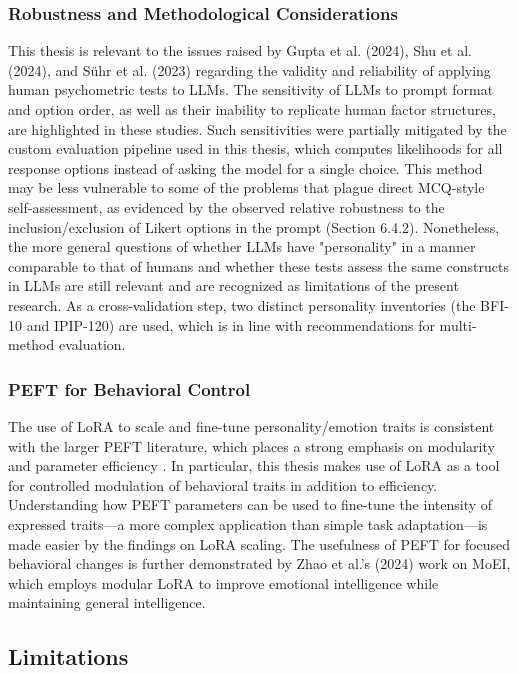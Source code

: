 \documentclass{DESSThesis}
\begin{document}
\subsubsection{Robustness and Methodological Considerations}
This thesis is relevant to the issues raised by Gupta et al. (2024), Shu et al. (2024), and Sühr et al. (2023) regarding the validity and reliability of applying human psychometric tests to LLMs. The sensitivity of LLMs to prompt format and option order, as well as their inability to replicate human factor structures, are highlighted in these studies. Such sensitivities were partially mitigated by the custom evaluation pipeline used in this thesis, which computes likelihoods for all response options instead of asking the model for a single choice. This method may be less vulnerable to some of the problems that plague direct MCQ-style self-assessment, as evidenced by the observed relative robustness to the inclusion/exclusion of Likert options in the prompt (Section 6.4.2). Nonetheless, the more general questions of whether LLMs have "personality" in a manner comparable to that of humans and whether these tests assess the same constructs in LLMs are still relevant and are recognized as limitations of the present research. As a cross-validation step, two distinct personality inventories (the BFI-10 and IPIP-120) are used, which is in line with recommendations for multi-method evaluation.

\subsubsection{PEFT for Behavioral Control}
The use of LoRA to scale and fine-tune personality/emotion traits is consistent with the larger PEFT literature, which places a strong emphasis on modularity and parameter efficiency \cite{houlsby_parameter-efficient_2019, lialin_scaling_2023, hu_lora_2021, mao_survey_2025, poth_adapters_2023}. In particular, this thesis makes use of LoRA as a tool for controlled modulation of behavioral traits in addition to efficiency. Understanding how PEFT parameters can be used to fine-tune the intensity of expressed traits—a more complex application than simple task adaptation—is made easier by the findings on LoRA scaling. The usefulness of PEFT for focused behavioral changes is further demonstrated by Zhao et al.'s (2024) work on MoEI, which employs modular LoRA to improve emotional intelligence while maintaining general intelligence.

\subsection{Limitations}
\end{document}
